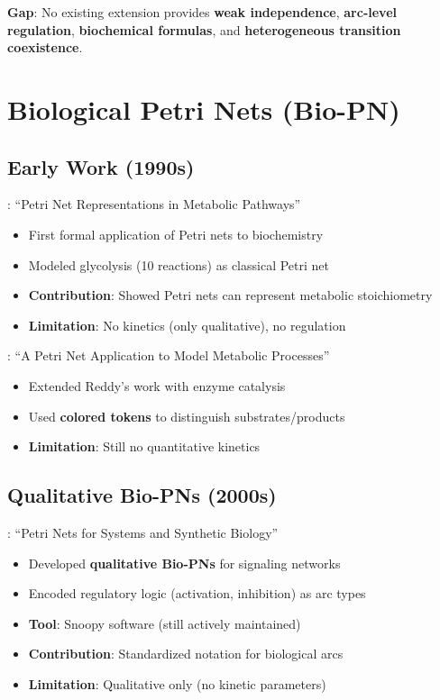 \textbf{Gap}: No existing extension provides \textbf{weak independence}, \textbf{arc-level regulation}, \textbf{biochemical formulas}, and \textbf{heterogeneous transition coexistence}.

\section{Biological Petri Nets (Bio-PN)}
\label{sec:bio-pn}

\subsection{Early Work (1990s)}
\label{subsec:early-bio-pn}

\textbf{\citet{Reddy1993}}: ``Petri Net Representations in Metabolic Pathways''

\begin{itemize}
    \item First formal application of Petri nets to biochemistry
    \item Modeled glycolysis (10 reactions) as classical Petri net
    \item \textbf{Contribution}: Showed Petri nets can represent metabolic stoichiometry
    \item \textbf{Limitation}: No kinetics (only qualitative), no regulation
\end{itemize}

\textbf{\citet{Hofestaedt1994}}: ``A Petri Net Application to Model Metabolic Processes''

\begin{itemize}
    \item Extended Reddy's work with enzyme catalysis
    \item Used \textbf{colored tokens} to distinguish substrates/products
    \item \textbf{Limitation}: Still no quantitative kinetics
\end{itemize}

\subsection{Qualitative Bio-PNs (2000s)}
\label{subsec:qualitative-bio-pn}

\textbf{\citet{Heiner2008}}: ``Petri Nets for Systems and Synthetic Biology''

\begin{itemize}
    \item Developed \textbf{qualitative Bio-PNs} for signaling networks
    \item Encoded regulatory logic (activation, inhibition) as arc types
    \item \textbf{Tool}: Snoopy software (still actively maintained)
    \item \textbf{Contribution}: Standardized notation for biological arcs
    \item \textbf{Limitation}: Qualitative only (no kinetic parameters)
\end{itemize}

